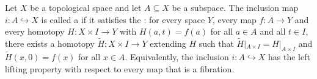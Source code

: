 \begin{definition} \label{definition:cofibration_of_topological_spaces}
Let $X$ be a topological space and let $A \subseteq X$ be a subspace. The inclusion map $i:A \hookrightarrow X$ is called a  if it satisfies the : for every space $Y$, every map $f:A \to Y$ and every homotopy $H:X \times I \to Y$ with $H(a, t) = f(a)$ for all $a \in A$ and all $t \in I$, there exists a homotopy $\tilde H:X \times I \to Y$ extending $H$ such that $\tilde H|_{A \times I} = H|_{A \times I}$ and $\tilde H(x,0) = f(x)$ for all $x \in A$.
Equivalently, the inclusion $i:A \hookrightarrow X$ has the left lifting property with respect to every map that is a fibration.
\end{definition}